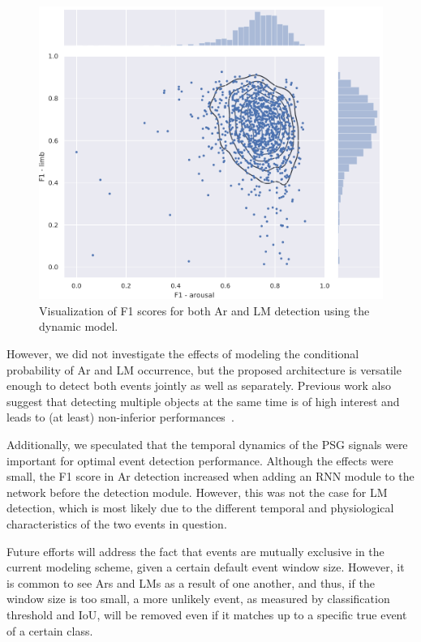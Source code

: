 \begin{figure}
    \centering
    \includegraphics[width=\textwidth]{figures/paper-iv/embc19-distribution.pdf}
    \caption[Visualization of F1 scores]{Visualization of F1 scores for both \ac{Ar} and \ac{LM} detection using the dynamic model.}
    \label{fig:paperiv-test_distribution}
\end{figure}
However, we did not investigate the effects of modeling the conditional probability of \ac{Ar} and \ac{LM} occurrence, but the proposed architecture is versatile enough to detect both events jointly as well as separately. 
Previous work also suggest that detecting multiple objects at the same time is of high interest and leads to (at least) non-inferior performances~\cite{Chambon2018b, Chambon2019, Redmon2016a, Redmon2016b, Liu2016}.

Additionally, we speculated that the temporal dynamics of the \ac{PSG} signals were important for optimal event detection performance. 
Although the effects were small, the F1 score in \ac{Ar} detection increased when adding an \ac{RNN} module to the network before the detection module. 
However, this was not the case for \ac{LM} detection, which is most likely due to the different temporal and physiological characteristics of the two events in question. 

Future efforts will address the fact that events are mutually exclusive in the current modeling scheme, given a certain default event window size. 
However, it is common to see \acp{Ar} and \acp{LM} as a result of one another, and thus, if the window size is too small, a more unlikely event, as measured by classification threshold and \ac{IoU}, will be removed even if it matches up to a specific true event of a certain class. 